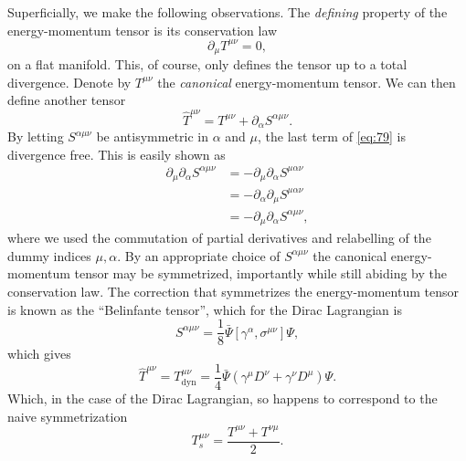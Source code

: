 Superficially, we make the following observations.
The \emph{defining} property of the energy-momentum tensor is its conservation law
\begin{equation}
  \label{eq:78}
  \partial_{\mu} T^{\mu \nu} = 0,
\end{equation}
on a flat manifold.
This, of course, only defines the tensor up to a total divergence.
Denote by \( T^{\mu \nu} \) the \emph{canonical} energy-momentum tensor.
We can then define another tensor
\begin{equation}
  \label{eq:79}
  \hat{T}^{\mu\nu} = T^{\mu \nu} + \partial_{\alpha} S^{\alpha \mu \nu}.
\end{equation}
By letting \( S^{\alpha \mu \nu} \) be antisymmetric in \( \alpha\) and \( \mu \), the last term of \cref{eq:79} is divergence free.
This is easily shown as
\begin{align}
  \label{eq:80}
  \partial_{\mu} \partial_{\alpha} S^{\alpha \mu \nu} &= - \partial_{\mu} \partial_{\alpha} S^{\mu \alpha \nu}\nonumber \\
                                                        &= - \partial_{\alpha} \partial_{\mu} S^{\mu \alpha \nu}\nonumber \\
  &= -\partial_{\mu} \partial_{\alpha} S^{\alpha \mu \nu},
\end{align}
where we used the commutation of partial derivatives and relabelling of the dummy indices \( \mu, \alpha \).
By an appropriate choice of \( S^{\alpha \mu \nu} \) the canonical energy-momentum tensor may be symmetrized, importantly while still abiding by the conservation law.
The correction that symmetrizes the energy-momentum tensor is known as the ``Belinfante tensor'', which for the Dirac Lagrangian is~\cite{chernodubThermalTransportGeometry2021}
\begin{equation}
  \label{eq:81}
  S^{\alpha \mu \nu} = \frac{1}{8} \bar{\Psi}\left[ \gamma^{\alpha}, \sigma^{\mu\nu} \right] \Psi,
\end{equation}
which gives
\begin{equation}
  \label{eq:82}
  \hat{T}^{\mu \nu} = T^{\mu \nu}_{\text{dyn}} = \frac{1}{4} \bar{\Psi} (\gamma^{\mu} D^{\nu} + \gamma^{\nu} D^{\mu}) \Psi.
\end{equation}
Which, in the case of the Dirac Lagrangian, so happens to correspond to the naive symmetrization
\begin{equation}
  \label{eq:83}
  T^{\mu\nu}_s = \frac{T^{\mu \nu} + T^{\nu \mu}}{2}.
\end{equation}

